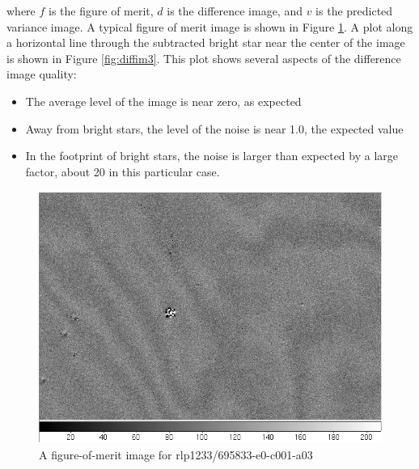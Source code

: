 where $f$ is the figure of merit, $d$ is the difference image, and $v$
is the predicted variance image.  A typical figure of merit image is
shown in Figure \ref{fig:diffim2}.  A plot along a horizontal line through
the subtracted bright star near the center of the image is shown in
Figure \ref{fig:diffim3}.  This plot shows several aspects of the difference
image quality:

\begin{itemize}
\item The average level of the image is near zero, as expected
\item Away from bright stars, the level of the noise is near 1.0, the
  expected value
\item In the footprint of bright stars, the noise is larger than
  expected by a large factor, about 20 in this particular case.
\end{itemize}  

\begin{figure}[p]
\begin{center}
\includegraphics[height=3.25in]{images/rlp1233_v695833-e0-c001-a03-fom_img.png}
\caption{A figure-of-merit image for
  rlp1233/695833-e0-c001-a03}  
\label{fig:diffim2}
\end{center}
\end{figure}

